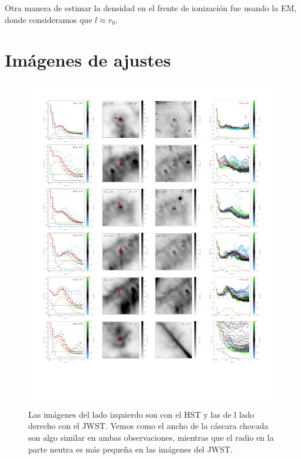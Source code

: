 \documentclass{book}
\begin{document}
Otra manera de estimar la densidad en el frente de ionización fue usando la EM, donde consideramos que $l\approx r_0$. 

\chapter{Imágenes de ajustes}

\begin{figure}[h!]
    \centering
    \includegraphics[width=1.2\textwidth]{imagenes Chapter 4/ajustes_075324-1.pdf}
    \caption{Las imágenes del lado izquierdo son con el HST y las de l lado derecho con el JWST. Vemos como el ancho de la cáscara chocada son algo similar en ambas observaciones, mientras que el radio en la parte neutra es más pequeña en las imágenes del JWST.}
    \label{GooG}
\end{figure}
\end{document}
